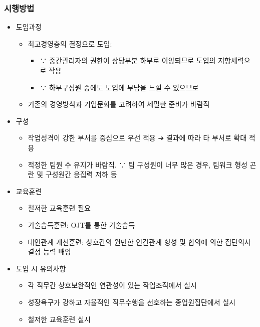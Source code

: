 \documentclass[aspectratio=169,xcolor=dvipsnames,handout]{beamer}
\begin{document}
\begin{frame}[allowframebreaks]
    \frametitle{시행방법}
    \begin{itemize}[<+->]
        \item 도입과정
        \begin{itemize}[<+->]
            \item 최고경영층의 결정으로 도입:
            \begin{itemize}[<+->]
                \item ∵ 중간관리자의 권한이 상당부분 하부로 이양되므로 도입의 저항세력으로 작용
                \item ∵ 하부구성원 중에도 도입에 부담을 느낄 수 있으므로
            \end{itemize}
        \item 기존의 경영방식과 기업문화를 고려하여 세밀한 준비가 바람직
        \end{itemize}
    \item 구성
        \begin{itemize}[<+->]
            \item 작업성격이 강한 부서를 중심으로 우선 적용 ➔ 결과에 따라 타 부서로 확대 적용
            \item 적정한 팀원 수 유지가 바람직. ∵ 팀 구성원이 너무 많은 경우, 팀워크 형성 곤란 및 구성원간 응집력 저하 등
        \end{itemize}
    \framebreak\relax
    \item 교육훈련
        \begin{itemize}[<+->]
            \item 철저한 교육훈련 필요
            \item 기술습득훈련: OJT를 통한 기술습득
            \item 대인관계 개선훈련: 상호간의 원만한 인간관계 형성 및 합의에 의한 집단의사결정 능력 배양
        \end{itemize}
    \item 도입 시 유의사항
        \begin{itemize}[<+->]
            \item 각 직무간 상호보완적인 연관성이 있는 작업조직에서 실시
            \item 성장욕구가 강하고 자율적인 직무수행을 선호하는 종업원집단에서 실시
            \item 철저한 교육훈련 실시
        \end{itemize}
    \end{itemize}
\end{frame}
\end{document}
